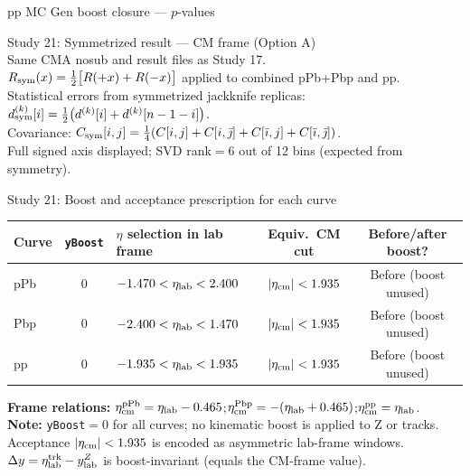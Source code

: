 \documentclass[aspectratio=169]{beamer}
\newcommand{\sectionframe}[2]{%
  \begin{frame}[c]
    \centering\Large #1\\\normalsize\vspace{0.6em}#2
  \end{frame}
}
\begin{document}
\begin{frame}[t]{pp MC Gen boost closure --- $p$-values}
  \vspace{0.5em}\centering
  \resizebox{0.88\linewidth}{!}{}
\end{frame}

\begin{frame}[c]\label{sec:boost_end}\end{frame}

\sectionframe{Study 21: Symmetrized result --- CM frame (Option A)}{%
  Same CMA nosub and result files as Study 17.\\[0.3em]
  $R_{\rm sym}(x) = \tfrac{1}{2}\bigl[R(+x)+R(-x)\bigr]$ applied to combined pPb+Pbp and pp.\\[0.3em]
  Statistical errors from symmetrized jackknife replicas:
  $d_{\rm sym}^{(k)}[i] = \tfrac{1}{2}\bigl(d^{(k)}[i]+d^{(k)}[n-1-i]\bigr)$.\\[0.3em]
  Covariance: $C_{\rm sym}[i,j]=\tfrac{1}{4}(C[i,j]+C[i,\bar\jmath]+C[\bar\imath,j]+C[\bar\imath,\bar\jmath])$.\\[0.3em]
  Full signed axis displayed; SVD rank$=6$ out of 12 bins (expected from symmetry).%
}\label{sec:symcma_start}

\begin{frame}[t]{Study 21: Boost and acceptance prescription for each curve}
  \footnotesize\vspace{0.4em}
  \begin{tabular}{l|c|l|c|c}
    \hline
    Curve & \texttt{yBoost} & $\eta$ selection in lab frame & Equiv.\ CM cut & Before/after boost? \\
    \hline
    pPb & $0$ & $-1.470 < \eta_{\rm lab} < 2.400$ & $|\eta_{\rm cm}|<1.935$ & Before (boost unused) \\
    Pbp & $0$ & $-2.400 < \eta_{\rm lab} < 1.470$ & $|\eta_{\rm cm}|<1.935$ & Before (boost unused) \\
    pp  & $0$ & $-1.935 < \eta_{\rm lab} < 1.935$ & $|\eta_{\rm cm}|<1.935$ & Before (boost unused) \\
    \hline
  \end{tabular}
  \vspace{0.5em}\par\small
  \textbf{Frame relations:} $\eta_{\rm cm}^{\rm pPb}=\eta_{\rm lab}-0.465$;\quad $\eta_{\rm cm}^{\rm Pbp}=-(\eta_{\rm lab}+0.465)$;\quad $\eta_{\rm cm}^{\rm pp}=\eta_{\rm lab}$.\\[0.4em]
  \textbf{Note:} \texttt{yBoost}$=0$ for all curves; no kinematic boost is applied to Z or tracks.
  Acceptance $|\eta_{\rm cm}|<1.935$ is encoded as asymmetric lab-frame windows.
  $\Delta y = \eta_{\rm lab}^{\rm trk}-y_{\rm lab}^Z$ is boost-invariant (equals the CM-frame value).
\end{frame}
\end{document}
